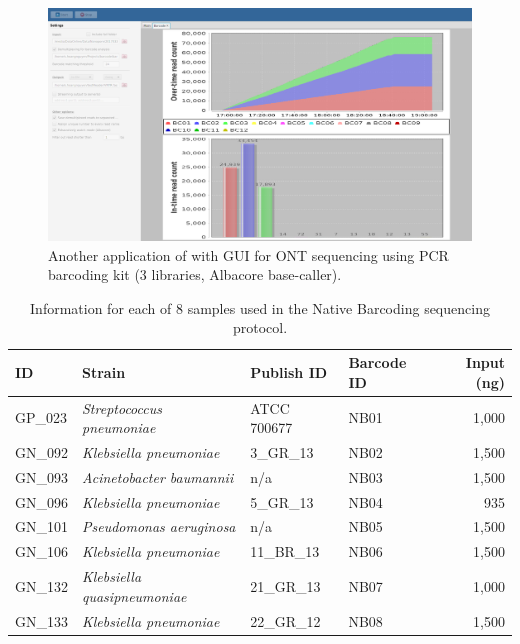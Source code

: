 \begin{figure}[!hp]
\includegraphics[width=\textwidth]{images/vntr1.png}  
\caption[PCR barcode MinION sequencing with \npbarcode{}]
{Another application of \npbarcode{} with GUI for ONT sequencing using PCR barcoding kit (3 libraries, Albacore base-caller).}
\label{supp_fig:npbarcode_pcr}
\end{figure}

\begin{table}[!htb]
\caption{Information for each of 8 samples used in the Native Barcoding sequencing protocol.}
\label{supp_tab:sample}
\centering
\begin{tabular}{llllr}
\hline
\toprule
\textbf{ID} & \textbf{Strain}          & \textbf{Publish ID} & \textbf{Barcode ID} & \textbf{Input (ng)} \\\hline
\rowcolor{Gray} 
GP\_023            & \emph{Streptococcus pneumoniae} &        ATCC 700677              & NB01                & 1,000                \\
GN\_092            & \emph{Klebsiella pneumoniae}    &         3\_GR\_13~\cite{Miranda2018}             & NB02                & 1,500                \\
\rowcolor{Gray} 
GN\_093            & \emph{Acinetobacter baumannii}  &          n/a            & NB03                & 1,500                \\
GN\_096            & \emph{Klebsiella pneumoniae}    &         5\_GR\_13~\cite{Miranda2018}              & NB04                & 935                 \\
\rowcolor{Gray} 
GN\_101            & \emph{Pseudomonas aeruginosa}   &          n/a            & NB05                & 1,500                \\
GN\_106            & \emph{Klebsiella pneumoniae}    &         11\_BR\_13~\cite{Miranda2018}              & NB06                & 1,500                \\
\rowcolor{Gray} 
GN\_132            & \emph{Klebsiella quasipneumoniae}    &         21\_GR\_13~\cite{Miranda2018}              & NB07                & 1,000                \\
GN\_133            & \emph{Klebsiella pneumoniae}    &         22\_GR\_12~\cite{Miranda2018}              & NB08                & 1,500       \\\hline        
\end{tabular}
\end{table}

